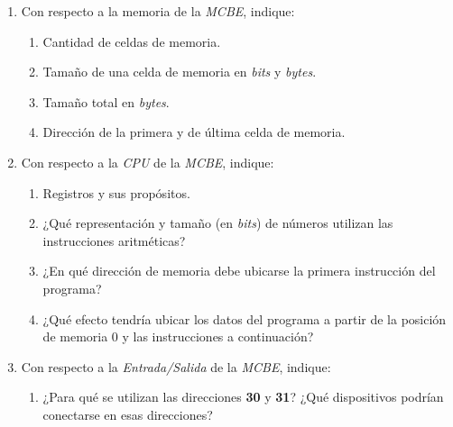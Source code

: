 \documentclass[12pt]{article}
\begin{document}
\begin{enumerate}

    \item Con respecto a la memoria de la \emph{MCBE}, indique:

        \begin{enumerate}

            \item Cantidad de celdas de memoria.

            \item Tamaño de una celda de memoria en \emph{bits}
                y \emph{bytes}.

            \item Tamaño total en \emph{bytes}.

            \item Dirección de la primera y de última celda de memoria.

        \end{enumerate}

    \item Con respecto a la \emph{CPU} de la \emph{MCBE}, indique:

        \begin{enumerate}

            \item Registros y sus propósitos.

            \item ¿Qué representación y tamaño (en \emph{bits}) de números
                utilizan las instrucciones aritméticas?

            \item ¿En qué dirección de memoria debe ubicarse la primera
                instrucción del programa?
            
            \item ¿Qué efecto tendría ubicar los datos del programa a partir
                de la posición de memoria 0 y las instrucciones a
                continuación?

        \end{enumerate}

    \item Con respecto a la \emph{Entrada/Salida} de la \emph{MCBE}, indique:

        \begin{enumerate}

            \item ¿Para qué se utilizan las direcciones \textbf{30} y
                \textbf{31}? ¿Qué dispositivos podrían conectarse en esas
                direcciones?


\end{enumerate}
\end{enumerate}
\end{document}
